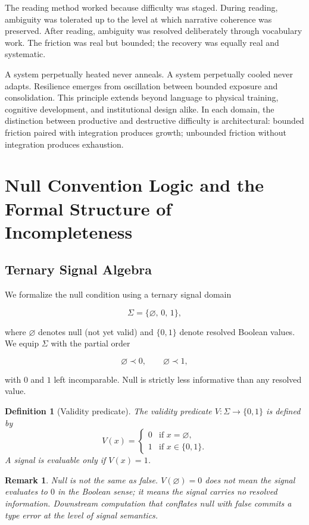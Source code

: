 \documentclass[11pt]{article}
\newtheorem{definition}{Definition}
\newtheorem{remark}{Remark}
\theoremstyle{remark}
\begin{document}
The reading method worked because difficulty was staged. During reading, ambiguity was tolerated up to the level at which narrative coherence was preserved. After reading, ambiguity was resolved deliberately through vocabulary work. The friction was real but bounded; the recovery was equally real and systematic.

A system perpetually heated never anneals. A system perpetually cooled never adapts. Resilience emerges from oscillation between bounded exposure and consolidation. This principle extends beyond language to physical training, cognitive development, and institutional design alike. In each domain, the distinction between productive and destructive difficulty is architectural: bounded friction paired with integration produces growth; unbounded friction without integration produces exhaustion.


\section{Null Convention Logic and the Formal Structure of Incompleteness}
\label{sec:ncl}

\subsection{Ternary Signal Algebra}

We formalize the null condition using a ternary signal domain

\[
\Sigma = \{\varnothing,\, 0,\, 1\},
\]

where $\varnothing$ denotes null (not yet valid) and $\{0,1\}$ denote resolved Boolean values. We equip $\Sigma$ with the partial order

\[
\varnothing \prec 0, \qquad \varnothing \prec 1,
\]

with $0$ and $1$ left incomparable. Null is strictly less informative than any resolved value.

\begin{definition}[Validity predicate]
The validity predicate $V : \Sigma \to \{0,1\}$ is defined by
\[
V(x) = \begin{cases} 0 & \text{if } x = \varnothing, \\ 1 & \text{if } x \in \{0,1\}. \end{cases}
\]
A signal is evaluable only if $V(x) = 1$.
\end{definition}

\begin{remark}
Null is not the same as false. $V(\varnothing) = 0$ does not mean the signal evaluates to $0$ in the Boolean sense; it means the signal carries no resolved information. Downstream computation that conflates null with false commits a type error at the level of signal semantics.
\end{remark}
\end{document}
